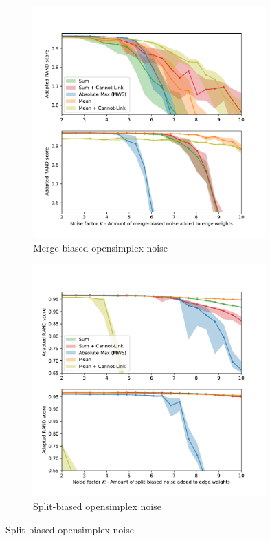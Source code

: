 % 

\begin{figure}
\centering
        \begin{subfigure}[t]{0.48 \textwidth}
        \centering
        \includegraphics[width=0.98\textwidth,trim=0.35in 0.35in 0.35in 0.35in,clip]{./figs/merge_noise.pdf}

        \caption{Merge-biased opensimplex noise} \label{fig:thresh}
    \end{subfigure}%
    \begin{subfigure}[t]{0.48 \textwidth}
        \centering
        \includegraphics[width=0.98\textwidth,trim=0.29in 0.31in 0.31in 0.31in,clip]{./figs/split_noise.pdf}
        \caption{Split-biased opensimplex noise} \label{fig:ws}
    \end{subfigure}



\end{figure}
